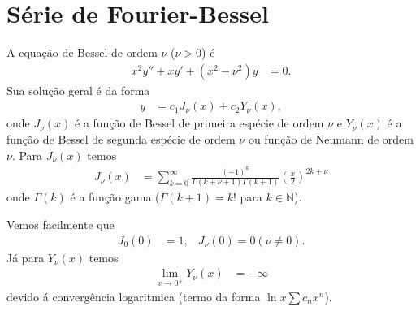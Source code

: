 \section{S\'{e}rie de Fourier-Bessel}
A equa\c{c}\~{a}o de Bessel de ordem $\nu$ ($\nu > 0$) \'{e}
\begin{align*}
    x^2 y'' + x y' + \left( x^2 - \nu^2 \right) y &= 0.
\end{align*}
Sua solu\c{c}\~{a}o geral \'{e} da forma
\begin{align*}
    y &= c_1 J_\nu(x) + c_2 Y_\nu(x),
\end{align*}
onde $J_\nu(x)$ \'{e} a fun\c{c}\~{a}o de Bessel de primeira esp\'{e}cie de ordem $\nu$ e $Y_\nu(x)$ \'{e} a fun\c{c}\~{a}o de Bessel de segunda esp\'{e}cie de ordem $\nu$ ou fun\c{c}\~{a}o de Neumann de ordem $\nu$. Para $J_\nu(x)$ temos
\begin{align*}
    J_\nu(x) &= \sum_{k = 0}^\infty \frac{(-1)^k}{\Gamma(k + \nu + 1) \Gamma(k + 1)} \left( \frac{x}{2} \right)^{2k + \nu}
\end{align*}
onde $\Gamma(k)$ \'{e} a fun\c{c}\~{a}o gama ($\Gamma(k + 1) = k!$ para $k \in \mathbb{N}$).

Vemos facilmente que
\begin{align*}
    J_0(0) &= 1, & J_\nu(0) = 0 (\nu \neq 0).
\end{align*}
J\'{a} para $Y_\nu(x)$ temos
\begin{align*}
    \lim_{x \to 0^+} Y_\nu(x) &= -\infty
\end{align*}
devido \'{a} converg\^{e}ncia logaritmica (termo da forma $\ln x \sum c_n x^n$).
